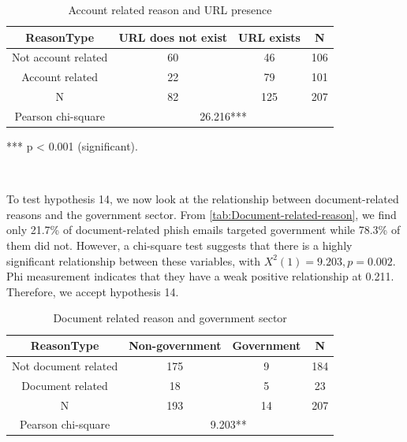 \begin{minipage}[t]{1\columnwidth}%
\begin{longtable}{cccc}
\caption{\label{tab:Account-related-reason-1}Account related reason and URL
presence}
\tabularnewline
\toprule 
{\footnotesize{}ReasonType} & {\footnotesize{}URL does not exist} & {\footnotesize{}URL exists} & \multirow{1}{*}{{\footnotesize{}N}}\tabularnewline
\midrule 
\multirow{1}{*}{{\footnotesize{}Not account related}} & {\footnotesize{}60} & {\footnotesize{}46} & \multirow{1}{*}{{\footnotesize{}106}}\tabularnewline
\midrule 
\multirow{1}{*}{{\footnotesize{}Account related}} & {\footnotesize{}22} & {\footnotesize{}79} & \multirow{1}{*}{{\footnotesize{}101}}\tabularnewline
\midrule
\midrule 
{\footnotesize{}N} & {\footnotesize{}82} & {\footnotesize{}125} & {\footnotesize{}207}\tabularnewline
\midrule
\midrule 
{\footnotesize{}Pearson chi-square} & \multicolumn{3}{c}{{\footnotesize{}26.216{*}{*}{*}}}\tabularnewline
\midrule
\end{longtable}%
\end{minipage}

{*}{*}{*} p < 0.001 (significant).

\ 

To test hypothesis 14, we now look at the relationship between document-related
reasons and the government sector. From \autoref{tab:Document-related-reason},
we find only 21.7\% of document-related phish emails targeted government
while 78.3\% of them did not. However, a chi-square test suggests
that there is a highly significant relationship between these variables,
with $X^{2}(1)=9.203,p=0.002$. Phi measurement indicates that they
have a weak positive relationship at 0.211. Therefore, we accept hypothesis
14.

\begin{minipage}[t]{1\columnwidth}%
\begin{longtable}{cccc}
\caption{\label{tab:Document-related-reason}Document related reason and government
sector}
\tabularnewline
\toprule 
{\footnotesize{}ReasonType} & {\footnotesize{}Non-government} & {\footnotesize{}Government} & \multirow{1}{*}{{\footnotesize{}N}}\tabularnewline
\midrule 
\multirow{1}{*}{{\footnotesize{}Not document related}} & {\footnotesize{}175} & {\footnotesize{}9} & \multirow{1}{*}{{\footnotesize{}184}}\tabularnewline
\midrule 
\multirow{1}{*}{{\footnotesize{}Document related}} & {\footnotesize{}18} & {\footnotesize{}5} & \multirow{1}{*}{{\footnotesize{}23}}\tabularnewline
\midrule 
{\footnotesize{}N} & {\footnotesize{}193} & {\footnotesize{}14} & {\footnotesize{}207}\tabularnewline
\midrule 
{\footnotesize{}Pearson chi-square} & \multicolumn{3}{c}{{\footnotesize{}9.203{*}{*}}}\tabularnewline
\midrule
\end{longtable}%
\end{minipage}

